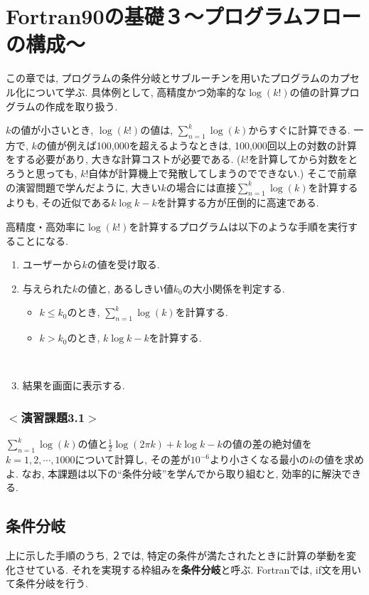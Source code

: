 \chapter{Fortran90の基礎３〜プログラムフローの構成〜}

この章では, プログラムの条件分岐とサブルーチンを用いたプログラムのカプセル化について学ぶ. 
具体例として, 高精度かつ効率的な$\log(k!)$の値の計算プログラムの作成を取り扱う. 

$k$の値が小さいとき, $\log(k!)$の値は, $\sum_{n=1}^{k}\log(k)$からすぐに計算できる. 
一方で, $k$の値が例えば100,000を超えるようなときは, 100,000回以上の対数の計算をする必要があり, 
大きな計算コストが必要である. 
($k!$を計算してから対数をとろうと思っても, $k!$自体が計算機上で発散してしまうのでできない.)
そこで前章の演習問題で学んだように, 
大きい$k$の場合には直接$\sum_{n=1}^{k}\log(k)$を計算するよりも, 
その近似である$k\log{k}-k$を計算する方が圧倒的に高速である. 

高精度・高効率に$\log(k!)$を計算するプログラムは以下のような手順を実行することになる. 

\begin{enumerate}
  \item ユーザーから$k$の値を受け取る. 
  \item 与えられた$k$の値と, あるしきい値$k_0$の大小関係を判定する. 
  \begin{itemize}
    \item $k \leq k_0$のとき, $\sum_{n=1}^{k}\log(k)$を計算する.
    \item $k>k_0$のとき, $k\log{k}-k$を計算する.
  \end{itemize}
　\item 結果を画面に表示する. 
\end{enumerate}


\subsection*{$<$演習課題3.1$>$}
$\sum_{n=1}^{k}\log(k)$の値と$\frac{1}{2}\log(2\pi k) + k\log{k}-k$の値の差の絶対値を
$k=1,2, \cdots, 1000$について計算し, その差が$10^{-6}$より小さくなる最小の$k$の値を求めよ. 
なお, 本課題は以下の``条件分岐''を学んでから取り組むと, 効率的に解決できる. 


\section{条件分岐}
上に示した手順のうち, ２では, 特定の条件が満たされたときに計算の挙動を変化させている. 
それを実現する枠組みを{\bfseries 条件分岐}と呼ぶ. 
Fortranでは, {\ttfamily if}文を用いて条件分岐を行う. 

